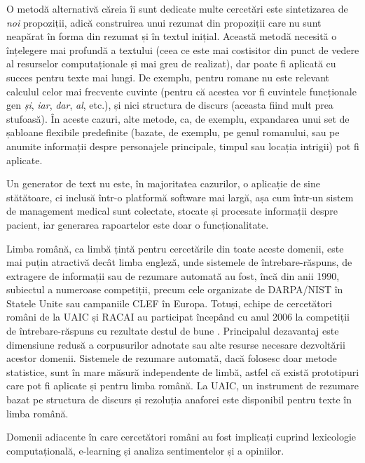 \documentclass[]{../../metanetpaper}
\begin{document}
\begin{multicols}{2}
O metodă alternativă căreia îi sunt dedicate multe cercetări este sintetizarea de \textit{noi} propoziții, adică construirea unui rezumat din propoziții care nu sunt neapărat în forma din rezumat și în textul inițial. Această metodă necesită o înțelegere mai profundă a textului (ceea ce este mai costisitor din punct de vedere al resurselor computaționale și mai greu de realizat), dar poate fi aplicată cu succes pentru texte mai lungi. De exemplu, pentru romane nu este relevant calculul celor mai frecvente cuvinte (pentru că acestea vor fi cuvintele funcționale gen \textit{și}, \textit{iar}, \textit{dar}, \textit{al}, etc.), și nici structura de discurs (aceasta fiind mult prea stufoasă). În aceste cazuri, alte metode, ca, de exemplu, expandarea unui set de șabloane flexibile predefinite (bazate, de exemplu, pe genul romanului, sau pe anumite informații despre personajele principale, timpul sau locația intrigii) pot fi aplicate. 

Un generator de text nu este, în majoritatea cazurilor, o aplicație de sine stătătoare, ci inclusă într-o platformă software mai largă, așa cum într-un sistem de management medical sunt colectate, stocate și procesate informații despre pacient, iar generarea rapoartelor este doar o funcționalitate.


Limba română, ca limbă țintă pentru cercetările din toate aceste domenii, este mai puțin atractivă decât limba engleză, unde sistemele de întrebare-răspuns, de extragere de informații sau de rezumare automată au fost, încă din anii 1990, subiectul a numeroase competiții, precum cele organizate de DARPA/NIST în Statele Unite sau campaniile CLEF în Europa. Totuși, echipe de cercetători români de la UAIC și RACAI au participat începând cu anul 2006 la competiții de întrebare-răspuns cu rezultate destul de bune \cite{qa}. Principalul dezavantaj este dimensiune redusă a corpusurilor adnotate sau alte resurse necesare dezvoltării acestor domenii. Sistemele de rezumare automată, dacă folosesc doar metode statistice, sunt în mare măsură independente de limbă, astfel că există prototipuri care pot fi aplicate și pentru limba română. La UAIC, un instrument de rezumare bazat pe structura de discurs și rezoluția anaforei este disponibil pentru texte în limba română.

Domenii adiacente în care cercetători români au fost implicați cuprind lexicologie computațională, e-learning și analiza sentimentelor și a opiniilor. 


\end{multicols}
\end{document}
